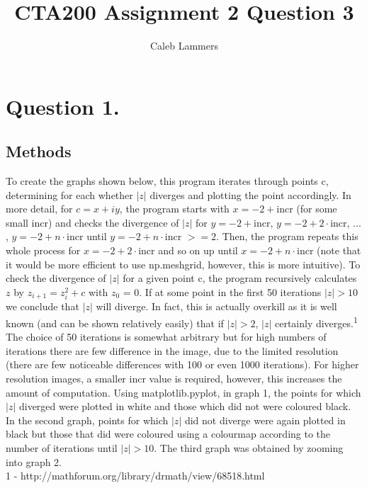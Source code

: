 \documentclass{article}
\title{CTA200 Assignment 2 Question 3}
\author{Caleb Lammers}
\begin{document}
\maketitle

\section*{Question 1.}

\subsection*{Methods}

To create the graphs shown below, this program iterates
through points c, determining for each whether $\left| z \right|$ diverges
and plotting the point accordingly. In more detail, for $c = x + iy$, the
program starts with $x = -2 +$incr (for some small incr) and checks the
divergence of $\left| z \right|$ for $y = -2 +$incr, $y = -2 +2\cdot$incr,
$...$, $y = -2 +n\cdot$incr until $y = -2 +n\cdot$incr $>= 2$. Then, the
program repeats this whole process for $x = -2 + 2\cdot$incr and so on up until $x = -2 +
n\cdot$incr (note that it would be more efficient to use np.meshgrid, however, this is more intuitive). To check the divergence of $\left| z \right|$ for a given point c, the program
recursively calculates $z$ by $z_{i+1} = z_i^2 + c$ with $z_0$ = 0. If at some point in the
first 50 iterations $\left| z \right| > 10$ we conclude that $\left| z
\right|$ will diverge. In fact, this is actually overkill as it is well known
(and can be shown relatively easily) that if $\left| z \right| > 2$,
$\left| z \right|$ certainly diverges.\textsuperscript{1} The choice of 50
iterations is somewhat arbitrary but for high numbers of iterations there
are few difference in the image, due to the limited resolution (there are few
noticeable differences with 100 or even 1000 iterations). For higher resolution images, a smaller incr value is required, however, this increases the amount of computation.
Using matplotlib.pyplot, in graph 1, the points for which $\left| z \right|$ diverged were plotted in white and those which did not were coloured black. In the second graph, points for which $\left| z \right|$ did not diverge were again plotted in black but those that did were coloured using a colourmap according to the number of iterations until $\left| z \right| > 10$. The third graph was obtained by zooming into graph 2. \\

 1 - http://mathforum.org/library/drmath/view/68518.html
\end{document}
